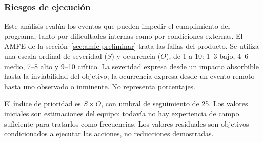 \subsubsection{Riesgos de ejecución}
Este análisis evalúa los eventos que pueden impedir el cumplimiento del programa, tanto por dificultades internas como por condiciones externas. El AMFE de la sección~\ref{sec:amfe-preliminar} trata las fallas del producto. Se utiliza una escala ordinal de severidad ($S$) y ocurrencia ($O$), de 1 a 10: 1--3 bajo, 4--6 medio, 7--8 alto y 9--10 crítico. La severidad expresa desde un impacto absorbible hasta la inviabilidad del objetivo; la ocurrencia expresa desde un evento remoto hasta uno observado o inminente. No representa porcentajes.

El índice de prioridad es $S\times O$, con umbral de seguimiento de 25. Los valores iniciales son estimaciones del equipo: todavía no hay experiencia de campo suficiente para tratarlos como frecuencias. Los valores residuales son objetivos condicionados a ejecutar las acciones, no reducciones demostradas.

